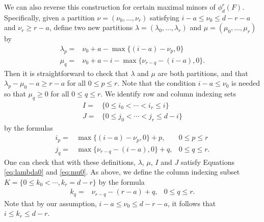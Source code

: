 \documentclass[unnumsec,webpdf,modern,medium]{oup-authoring-template}
\theoremstyle{theorem}
\theoremstyle{definition}
\begin{document}
We can also reverse this construction for certain maximal minors of $\phi^r_d(F)$.  Specifically, given a partition $\nu=(\nu_0,\ldots,\nu_r)$ satisfying $i-a\leq \nu_0\leq  d-r-a$ and $\nu_r\geq r-a$, define two new partitions $\lambda=(\lambda_0,\ldots,\lambda_r)$ and $\mu=(\mu_0,\ldots,\mu_r)$ by 
\begin{align}
	\label{eq:lambda}
	\lambda_p= & \nu_0+a-\max\{(i-a)-\nu_p,0\}\\
	\label{eq:mu}
	\mu_q= & \nu_0+a-i-\max\{\nu_{r-q}-(i-a),0\}.
\end{align}
Then it is straightforward to check that $\lambda$ and $\mu$ are both partitions, and that  $\lambda_p-\mu_0-a\geq r-a$ for all $0\leq p\leq r$.  Note that the condition $i-a\leq \nu_0$ is needed so that $\mu_q\geq 0$ for all $0\leq q\leq r$.  We identify row and column indexing sets 
\begin{align*}
	I= & \{0\leq i_0<\cdots<i_r\leq i\}\\
	J= & \{0\leq j_0<\cdots<j_r\leq d-i\}
\end{align*} 
by the formulas 
\begin{align}
	\label{eq:i}
	i_p= & \max\{(i-a)-\nu_p,0\}+p, & 0\leq p\leq r\\
	\label{eq:j}
	j_q= & \max\{\nu_{r-q}-(i-a),0\}+q, & 0\leq q\leq r.
\end{align}
One can check that with these definitions, $\lambda$, $\mu$, $I$ and $J$ satisfy Equations \eqref{eq:lambda0} and \eqref{eq:mu0}. 
As above, we define the column indexing subset $K=\{0\leq k_0<\cdots,k_r=d-r\}$ by the formula
\begin{align}
	\label{eq:K}
	k_q= & \nu_{r-q}-(r-a)+q, & 0\leq q\leq r.
\end{align}
Note that by our assumption, $i-a\leq \nu_0\leq d-r-a$, it follows that $i\leq k_r\leq d-r$.
\end{document}
